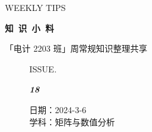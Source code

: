 \documentclass[UTF8]{ctexart}
\newcommand\Black[1]{\textcolor[gray]{0.3}{#1}}
\newcommand\Brown[1]{\textcolor[HTML]{998A4E}{#1}}
\newcommand\IssueNumber{18}
\newcommand\Date{2024-3-6}
\newcommand\Subject{矩阵与数值分析}
\begin{document}
\BgThispage
\begin{center}
{\scriptsize\Issue \textcolor[HTML]{C8BA83}{WEEKLY TIPS}}

{\Huge\bfseries\TitleFont \Black{知\ 识\ 小\ 料}}

\vspace{-0.1cm}
{\footnotesize \Brown{「电计 2203 班」周常规知识整理共享}}
\end{center}

\vspace{-0.5cm}

\begin{figure}[H]
\hspace{1cm}
\begin{minipage}[t]{0.3\textwidth}
\centering
    \Brown{ISSUE.}

    \vspace{-0.6cm}
    \Huge \Issue\slshape\bfseries\Black{\IssueNumber}
\end{minipage}
\hfill
\begin{minipage}[t]{0.35\textwidth}
\centering
    \Brown{日期：\Date} \\
\vspace{-0.1cm}
    \Brown{学科：\Subject} \\
\end{minipage}
\hspace{0.8cm}
\end{figure}
\end{document}
